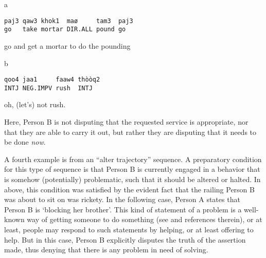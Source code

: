 \documentclass[output=paper]{langsci/langscibook}
\begin{document}
\vspace{-1mm}
%
\begin{mdframednoverticalspace}[style=firstfoc]
\begin{transbox}{1}{a}
\begin{verbatim}
paj3 qaw3 khok1  maø     tam3  paj3
go   take mortar DIR.ALL pound go
\end{verbatim}
go and get a mortar to do the pounding
\end{transbox}
\end{mdframednoverticalspace}
%
\begin{mdframednoverticalspace}[style=secondfoc]
\begin{transbox}{2}{b}
\begin{verbatim}
qoo4 jaa1     faaw4 thòòq2
INTJ NEG.IMPV rush  INTJ
\end{verbatim}
oh, (let’s) not rush.
\end{transbox}
\end{mdframednoverticalspace}\bigskip

Here, Person B is not disputing that the requested service is appropriate, nor that they are able to carry it out, but rather they are disputing that it needs to be done \textit{now}.

A fourth example is from an “alter trajectory” sequence. A preparatory condition for this type of sequence is that Person B is currently engaged in a behavior that is somehow (potentially) problematic, such that it should be altered or halted. In  above, this condition was satisfied by the evident fact that the railing Person B was about to sit on was rickety. In the following case, Person A states that Person B is ‘blocking her brother’. This kind of statement of a problem is a well-known way of getting someone to do something (see \citealt{Rossi2018} and references therein), or at least, people may respond to such statements by helping, or at least offering to help. But in this case, Person B explicitly disputes the truth of the assertion made, thus denying that there is any problem in need of solving. %
\end{document}
